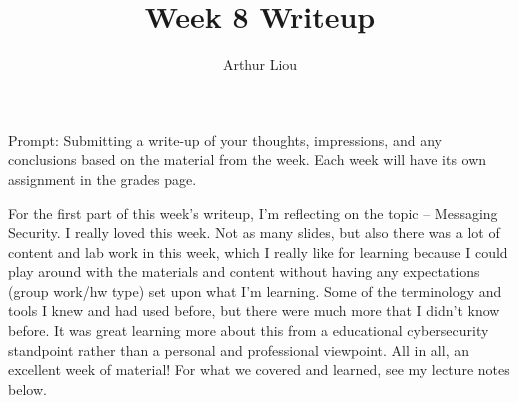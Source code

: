 \documentclass[12pt]{article}
\begin{document}
 
 
\title{Week 8 Writeup}
\author{Arthur Liou}

\maketitle

Prompt: Submitting a write-up of your thoughts, impressions, and any conclusions based on the material from the week. Each week will have its own assignment in the grades page.
\par

\linebreak
For the first part of this week’s writeup, I’m reflecting on the topic – Messaging Security. I really loved this week. Not as many slides, but also there was a lot of content and lab work in this week, which I really like for learning because I could play around with the materials and content without having any expectations (group work/hw type) set upon what I’m learning. Some of the terminology and tools I knew and had used before, but there were much more that I didn’t know before. It was great learning more about this from a educational cybersecurity standpoint rather than a personal and professional viewpoint. All in all, an excellent week of material!
For what we covered and learned, see my lecture notes below.
\end{document}
